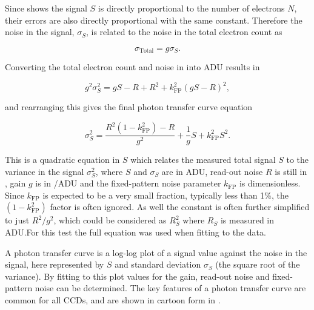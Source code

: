 \begin{colsection}
\begin{colsection}
Since  shows the signal $S$ is directly proportional to the number of electrons $N$, their errors are also directly proportional with the same constant. Therefore the noise in the signal, $\sigma_S$, is related to the noise in the total electron count as

\begin{equation}
    \sigma_\text{Total} = g \sigma_S.
    \label{eq:noise_gain}
\end{equation}

Converting the total electron count and noise in  into ADU results in

\begin{equation}
    g^2\sigma_S^2 = gS - R + R^2 + k_\text{FP}^2 {(gS - R)}^2,
    \label{eq:ptc_noise2}
\end{equation}

and rearranging this gives the final photon transfer curve equation

\begin{equation}
    \sigma_S^2 = \frac{R^2(1-k_\text{FP}^2) - R}{g^2} + \frac{1}{g}S + k_\text{FP}^2 S^2.
    \label{eq:ptc}
\end{equation}

This is a quadratic equation in $S$ which relates the measured total signal $S$ to the variance in the signal $\sigma_S^2$, where $S$ and $\sigma_S$ are in ADU, read-out noise $R$ is still in \elec, gain $g$ is in \elec/ADU and the fixed-pattern noise parameter $k_\text{FP}$ is dimensionless. Since $k_\text{FP}$ is expected to be a very small fraction, typically less than 1\%, the $(1-k_\text{FP}^2)$ factor is often ignored. As well the constant is often further simplified to just $R^2/g^2$, which could be considered as $R_S^2$ where $R_S$ is measured in ADU.\@ For this test the full equation was used when fitting to the data.

A photon transfer curve is a log-log plot of a signal value against the noise in the signal, here represented by $S$ and standard deviation $\sigma_S$ (the square root of the variance). By fitting  to this plot values for the gain, read-out noise and fixed-pattern noise can be determined. The key features of a photon transfer curve are common for all CCDs, and are shown in cartoon form in .

\newpage


\end{colsection}
\end{colsection}
